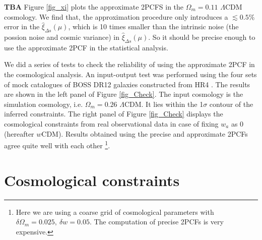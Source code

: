 \documentclass[iop]{emulateapj}
\begin{document}
{\bf TBA}
Figure \ref{fig_xi} plots the approximate 2PCFS in the $\Omega_m=0.11$ $\Lambda$CDM cosmology.
We find that, the approximation procedure only introduces a $\lesssim0.5\%$ error in the $\hat\xi_{\Delta s}(\mu)$, 
which is 10 times smaller than the intrinsic noise (the possion noise and cosmic variance) in $\hat\xi_{\Delta s}(\mu)$.
So it should be precise enough to use the approximate 2PCF in the statistical analysis.

We did a series of tests to check the reliability of using the approximate 2PCF in the cosmological analysis.
An input-output test was performed using the four sets of mock catalogues of BOSS DR12 galaxies constructed from HR4 \citep{HR4}.
The results are shown in the left panel of Figure \ref{fig_Check}. 
The input cosmology is the simulation cosmology, i.e. $\Omega_m=0.26$ $\Lambda$CDM.
It lies within the 1$\sigma$ contour of the inferred constraints.
The right panel of Figure \ref{fig_Check} displays the cosmological constraints from real observational data
in case of fixing $w_a$ as 0 (hereafter $w$CDM).
Results obtained using the precise and approximate 2PCFs agree quite well with each other
\footnote{Here we are using a coarse grid of cosmological parameters with $\delta \Omega_m=0.025,\ \delta w=0.05$.
The computation of precise 2PCFs is very expensive.}.





\section{Cosmological constraints}
\end{document}

